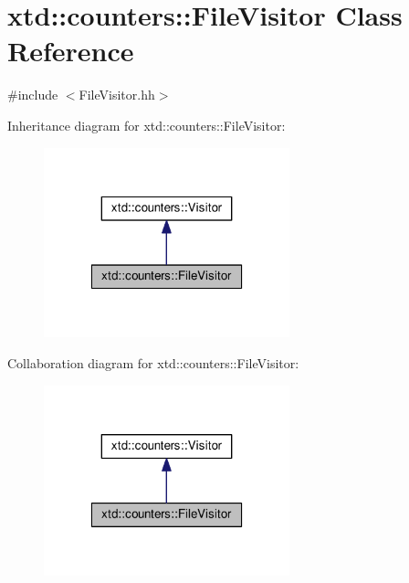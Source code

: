 \hypertarget{classxtd_1_1counters_1_1FileVisitor}{\section{xtd\-:\-:counters\-:\-:File\-Visitor Class Reference}
\label{classxtd_1_1counters_1_1FileVisitor}
}


{\ttfamily \#include $<$File\-Visitor.\-hh$>$}



Inheritance diagram for xtd\-:\-:counters\-:\-:File\-Visitor\-:
\nopagebreak
\begin{figure}[H]
\begin{center}
\leavevmode
\includegraphics[width=202pt]{classxtd_1_1counters_1_1FileVisitor__inherit__graph}
\end{center}
\end{figure}


Collaboration diagram for xtd\-:\-:counters\-:\-:File\-Visitor\-:
\nopagebreak
\begin{figure}[H]
\begin{center}
\leavevmode
\includegraphics[width=202pt]{classxtd_1_1counters_1_1FileVisitor__coll__graph}
\end{center}
\end{figure}
